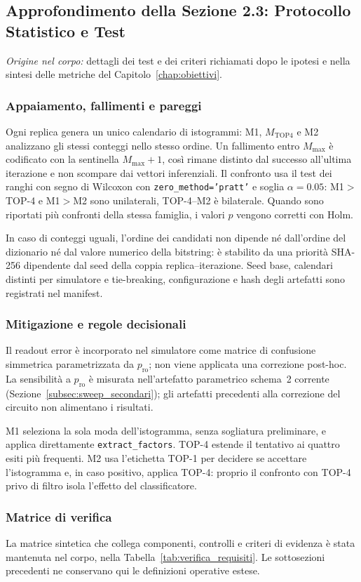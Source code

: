 \begin{onehalfspace}
\subsection{Approfondimento della Sezione 2.3: Protocollo Statistico e Test}
\label{app:obiettivi:protocollo}

\noindent\textit{Origine nel corpo:} dettagli dei test e dei criteri richiamati dopo le ipotesi e nella sintesi delle metriche del Capitolo~\ref{chap:obiettivi}.

\subsubsection{Appaiamento, fallimenti e pareggi}

Ogni replica genera un unico calendario di istogrammi: M1, $M_{\mathrm{TOP4}}$ e M2 analizzano gli stessi conteggi nello stesso ordine. Un fallimento entro $M_{\max}$ è codificato con la sentinella $M_{\max}+1$, così rimane distinto dal successo all'ultima iterazione e non scompare dai vettori inferenziali. Il confronto usa il test dei ranghi con segno di Wilcoxon con \texttt{zero\_method='pratt'} e soglia $\alpha=0.05$: M1$>$TOP-4 e M1$>$M2 sono unilaterali, TOP-4--M2 è bilaterale. Quando sono riportati più confronti della stessa famiglia, i valori $p$ vengono corretti con Holm.

In caso di conteggi uguali, l'ordine dei candidati non dipende né dall'ordine del dizionario né dal valore numerico della bitstring: è stabilito da una priorità SHA-256 dipendente dal seed della coppia replica--iterazione. Seed base, calendari distinti per simulatore e tie-breaking, configurazione e hash degli artefatti sono registrati nel manifest.

\subsubsection{Mitigazione e regole decisionali}

Il readout error è incorporato nel simulatore come matrice di confusione simmetrica parametrizzata da $p_{\mathrm{ro}}$; non viene applicata una correzione post-hoc. La sensibilità a $p_{\mathrm{ro}}$ è misurata nell'artefatto parametrico schema~2 corrente (Sezione~\ref{subsec:sweep_secondari}); gli artefatti precedenti alla correzione del circuito non alimentano i risultati.

M1 seleziona la sola moda dell'istogramma, senza sogliatura preliminare, e applica direttamente \texttt{extract\_factors}. TOP-4 estende il tentativo ai quattro esiti più frequenti. M2 usa l'etichetta TOP-1 per decidere se accettare l'istogramma e, in caso positivo, applica TOP-4: proprio il confronto con TOP-4 privo di filtro isola l'effetto del classificatore.

\subsubsection{Matrice di verifica}

La matrice sintetica che collega componenti, controlli e criteri di evidenza è
stata mantenuta nel corpo, nella Tabella~\ref{tab:verifica_requisiti}. Le
sottosezioni precedenti ne conservano qui le definizioni operative estese.

\end{onehalfspace}
